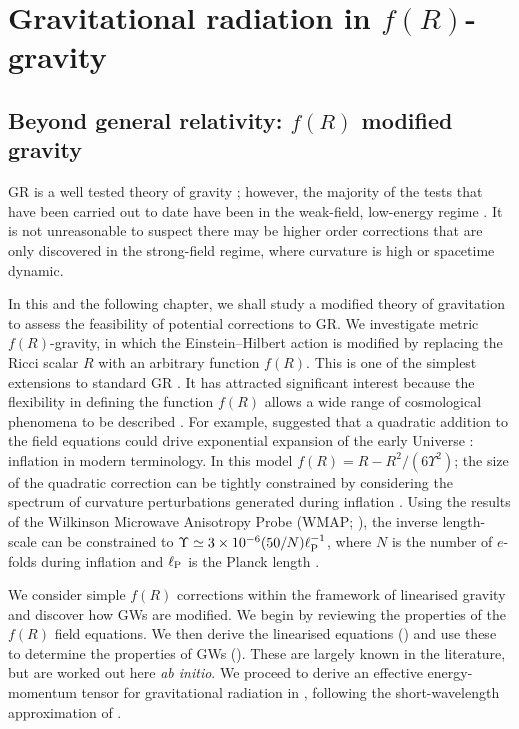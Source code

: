 \chapter{Gravitational radiation in $f(R)$-gravity\label{ch:f-R1}}

\section{Beyond general relativity: $f(R)$ modified gravity}

GR is a well tested theory of gravity \citep{Will2006}; however, the majority of the tests that have been carried out to date have been in the weak-field, low-energy regime \citep{Will1993,Psaltis2008a}. It is not unreasonable to suspect there may be higher order corrections that are only discovered in the strong-field regime, where curvature is high or spacetime dynamic.

In this and the following chapter, we shall study a modified theory of gravitation to assess the feasibility of potential corrections to GR. We investigate metric $f(R)$-gravity, in which the Einstein--Hilbert action is modified by replacing the Ricci scalar $R$ with an arbitrary function $f(R)$. This is one of the simplest extensions to standard GR \citep{Sotiriou2010, DeFelice2010}. It has attracted significant interest because the flexibility in defining the function $f(R)$ allows a wide range of cosmological phenomena to be described \citep{Nojiri2007, Capozziello2007a}. For example, \citet{Starobinsky1980} suggested that a quadratic addition to the field equations could drive exponential expansion of the early Universe \citep{Vilenkin1985}: inflation in modern terminology. In this model $f(R) = R - R^2/(6\Upsilon^2)$; the size of the quadratic correction can be tightly constrained by considering the spectrum of curvature perturbations generated during inflation \citep{Starobinskii1983, Starobinskii1985}. Using the results of the Wilkinson Microwave Anisotropy Probe (WMAP; \citealt{Bennett2012, Hinshaw2012}), the inverse length-scale can be constrained to $\Upsilon \simeq 3 \times 10^{-6} (50/N) \ell_\mathrm{P}^{-1}$, where $N$ is the number of $e$-folds during inflation and $\ell_\mathrm{P}$ is the Planck length \citep{Starobinsky2007, DeFelice2010}. %

We consider simple $f(R)$ corrections within the framework of linearised gravity and discover how GWs are modified. We begin by reviewing the properties of the $f(R)$ field equations. We then derive the linearised equations () and use these to determine the properties of GWs (). These are largely known in the literature, but are worked out here {\it ab initio}. We proceed to derive an effective energy-momentum tensor for gravitational radiation in , following the short-wavelength approximation of \citet{Isaacson1968, Isaacson1968a}.

